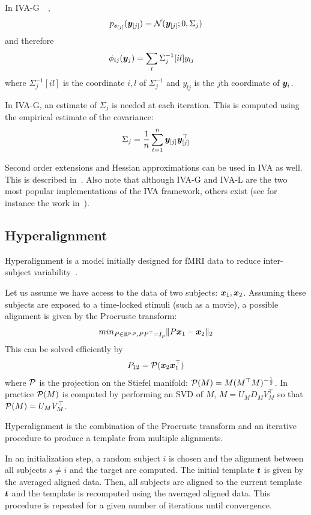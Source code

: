 In IVA-G~\cite{anderson2011joint}~\cite{via2011maximum},
\begin{align}
  p_{\boldsymbol{s}_{[j]}}(\boldsymbol{y}_{[j]}) = \mathcal{N}( \boldsymbol{y}_{[j]}; 0, \Sigma_j)
\end{align}
and therefore
\begin{align}
  \phi_{ij}(\boldsymbol{y}_j) &= \sum_l \Sigma_j^{-1}[il] y_{lj}
\end{align}
where  $\Sigma_j^{-1}[il]$ is the coordinate $i, l$ of $\Sigma_j^{-1}$ and
$y_{lj}$ is the $j$th coordinate of $\boldsymbol{y}_i$.

In IVA-G, an estimate of $\Sigma_j$ is needed at each iteration. This is
computed using the empirical estimate of the covariance:
\begin{align}
\Sigma_j = \frac1{n} \sum_{t=1}^n \boldsymbol{y}_{[j]} \boldsymbol{y}_{[j]}^{\top}
\end{align}

Second order extensions and Hessian approximations can be used in IVA as well.
This is described in~\cite{anderson2011joint}. Also note that although IVA-G and
IVA-L are the two most popular implementations of the IVA framework, others exist
(see for instance the work in~\cite{anderson2013independent}).

\subsection{Hyperalignment}
Hyperalignment is a model initially designed for fMRI data to reduce
inter-subject variability~\cite{haxby2011common}.

Let us assume we have access to the data of two subjects: $\boldsymbol{x}_1, \boldsymbol{x}_2$.
Assuming these subjects are exposed to a time-locked stimuli (such as a movie), a possible alignment is given by the Procruste transform:
\begin{align}
min_{P \in \mathbb{R}^{p, p}, PP^{\top} = I_p} \|P \boldsymbol{x}_1 - \boldsymbol{x}_2 \|_2
\end{align}
This can be solved efficiently by
\begin{align}
  P_{12} = \mathcal{P}(\boldsymbol{x}_2 \boldsymbol{x}_1^{\top})
\end{align}
where $\mathcal{P}$ is the projection on the Stiefel manifold: $\mathcal{P}(M) = M
(M^{\top}M)^{-\frac12}$. In practice $\mathcal{P}(M)$ is computed by performing an SVD
of $M$, $M = U_M D_M V_M^{\top} $ so that $\mathcal{P}(M) = U_M V_M^{\top}$.

Hyperalignment is the combination of the Procruste transform and an iterative
procedure to produce a template from multiple alignments.

In an initialization step, a random subject $i$ is chosen and the alignment
between all subjects $s \neq i$ and the target are computed. The initial
template $\boldsymbol{t}$ is given by the averaged aligned data. Then, all subjects are
aligned to the current template $\boldsymbol{t}$ and the template is recomputed using the
averaged aligned data. This procedure is repeated for a given number of
iterations until convergence.

